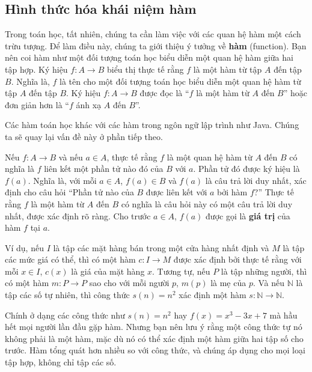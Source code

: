 \subsection{Hình thức hóa khái niệm hàm}

Trong toán học, tất nhiên, chúng ta cần làm việc với các quan hệ hàm một cách trừu tượng. Để làm điều này, chúng ta giới thiệu ý tưởng về \textbf{hàm} (function). Bạn nên coi hàm như một đối tượng toán học biểu diễn một quan hệ hàm giữa hai tập hợp. Ký hiệu $f\colon A \to B$ biểu thị thực tế rằng $f$ là một hàm từ tập $A$ đến tập $B$. Nghĩa là, $f$ là tên cho một đối tượng toán học biểu diễn một quan hệ hàm từ tập $A$ đến tập $B$. Ký hiệu $f\colon A \to B$ được đọc là ``$f$ là một hàm từ $A$ đến $B$'' hoặc đơn giản hơn là ``$f$ ánh xạ $A$ đến $B$''.

\begin{notebox}
Các hàm toán học khác với các hàm trong ngôn ngữ lập trình như Java. Chúng ta sẽ quay lại vấn đề này ở phần tiếp theo.
\end{notebox}

Nếu $f\colon A \to B$ và nếu $a \in A$, thực tế rằng $f$ là một quan hệ hàm từ $A$ đến $B$ có nghĩa là $f$ liên kết một phần tử nào đó của $B$ với $a$. Phần tử đó được ký hiệu là $f(a)$. Nghĩa là, với mỗi $a \in A$, $f(a) \in B$ và $f(a)$ là câu trả lời duy nhất, xác định cho câu hỏi ``Phần tử nào của $B$ được liên kết với $a$ bởi hàm $f$?'' Thực tế rằng $f$ là một hàm từ $A$ đến $B$ có nghĩa là câu hỏi này có một câu trả lời duy nhất, được xác định rõ ràng. Cho trước $a \in A$, $f(a)$ được gọi là \textbf{giá trị} của hàm $f$ tại $a$.

\begin{example}
Ví dụ, nếu $I$ là tập các mặt hàng bán trong một cửa hàng nhất định và $M$ là tập các mức giá có thể, thì có một hàm $c\colon I \to M$ được xác định bởi thực tế rằng với mỗi $x \in I$, $c(x)$ là giá của mặt hàng $x$. Tương tự, nếu $P$ là tập những người, thì có một hàm $m\colon P \to P$ sao cho với mỗi người $p$, $m(p)$ là mẹ của $p$. Và nếu $\mathbb{N}$ là tập các số tự nhiên, thì công thức $s(n) = n^2$ xác định một hàm $s\colon \mathbb{N} \to \mathbb{N}$.
\end{example}

Chính ở dạng các công thức như $s(n) = n^2$ hay $f(x) = x^3 - 3x + 7$ mà hầu hết mọi người lần đầu gặp hàm. Nhưng bạn nên lưu ý rằng một công thức tự nó không phải là một hàm, mặc dù nó có thể xác định một hàm giữa hai tập số cho trước. Hàm tổng quát hơn nhiều so với công thức, và chúng áp dụng cho mọi loại tập hợp, không chỉ tập các số.

